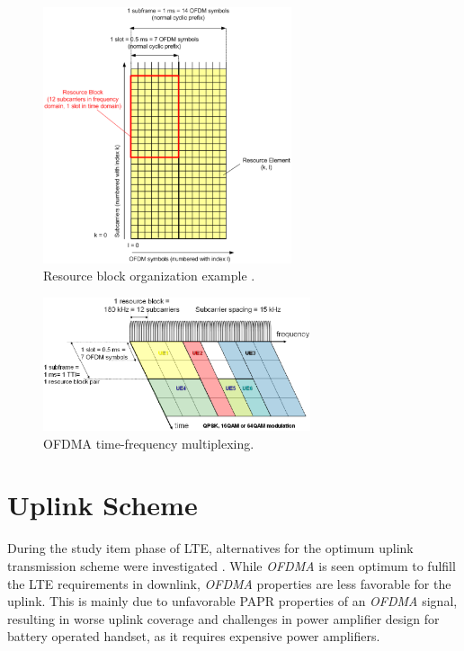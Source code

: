 \begin{figure}[htbp]
    \centering
    \includegraphics[width=0.65\textwidth]{./figures/ofdm_resource_block}
    \caption{ Resource block organization example \cite{umtslte}.
    \label{fig:ofdmresblk}}
\end{figure}

\begin{figure}[htbp]
    \centering
    \includegraphics[width=0.70\textwidth]{./figures/downlink_channels}
    \caption{ OFDMA time-frequency multiplexing.
    \label{fig:dlchann}}
\end{figure}


\section{Uplink Scheme}%

During the study item phase of LTE, alternatives for the optimum uplink
transmission scheme were investigated \cite{umtslte}. While \textit{OFDMA} is
seen optimum to fulfill the LTE requirements in downlink, \textit{OFDMA}
properties are less favorable for the uplink. This is mainly due to unfavorable
PAPR properties of an \textit{OFDMA} signal, resulting in worse uplink coverage
and challenges in power amplifier design for battery operated handset, as it
requires expensive power amplifiers.

